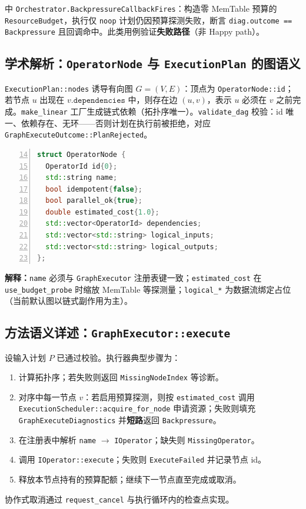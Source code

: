  中 \texttt{Orchestrator.BackpressureCallbackFires}：构造零 MemTable 预算的 \texttt{ResourceBudget}，执行仅 \texttt{noop} 计划仍因预算探测失败，断言 \texttt{diag.outcome == Backpressure} 且回调命中。此类用例验证\textbf{失败路径}（非 Happy path）。

\subsection{学术解析：\texttt{OperatorNode} 与 \texttt{ExecutionPlan} 的图语义}

\texttt{ExecutionPlan::nodes} 诱导有向图 $G=(V,E)$：顶点为 \texttt{OperatorNode::id}；若节点 $u$ 出现在 $v.\texttt{dependencies}$ 中，则存在边 $(u,v)$，表示 $u$ 必须在 $v$ 之前完成。\texttt{make\_linear} 工厂生成链式依赖（拓扑序唯一）。\texttt{validate\_dag} 校验：id 唯一、依赖存在、无环——否则计划在执行前被拒绝，对应 \texttt{GraphExecuteOutcome::PlanRejected}。

\begin{lstlisting}[language=C++, numbers=left, firstnumber=14]
struct OperatorNode {
  OperatorId id{0};
  std::string name;
  bool idempotent{false};
  bool parallel_ok{true};
  double estimated_cost{1.0};
  std::vector<OperatorId> dependencies;
  std::vector<std::string> logical_inputs;
  std::vector<std::string> logical_outputs;
};
\end{lstlisting}

\noindent\textbf{解释：}\texttt{name} 必须与 \texttt{GraphExecutor} 注册表键一致；\texttt{estimated\_cost} 在 \texttt{use\_budget\_probe} 时缩放 MemTable 等探测量；\texttt{logical\_*} 为数据流绑定占位（当前默认图以链式副作用为主）。

\subsection{方法语义详述：\texttt{GraphExecutor::execute}}

设输入计划 $P$ 已通过校验。执行器典型步骤为：
\begin{enumerate}
  \item 计算拓扑序；若失败则返回 \texttt{MissingNodeIndex} 等诊断。
  \item 对序中每一节点 $v$：若启用预算探测，则按 \texttt{estimated\_cost} 调用 \texttt{ExecutionScheduler::acquire\_for\_node} 申请资源；失败则填充 \texttt{GraphExecuteDiagnostics} 并\textbf{短路}返回 \texttt{Backpressure}。
  \item 在注册表中解析 \texttt{name} $\rightarrow$ \texttt{IOperator}；缺失则 \texttt{MissingOperator}。
  \item 调用 \texttt{IOperator::execute}；失败则 \texttt{ExecuteFailed} 并记录节点 id。
  \item 释放本节点持有的预算配额；继续下一节点直至完成或取消。
\end{enumerate}
协作式取消通过 \texttt{request\_cancel} 与执行循环内的检查点实现。

